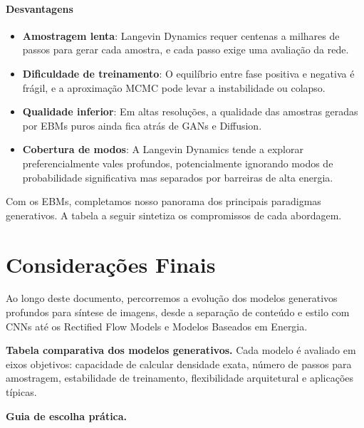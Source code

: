 \documentclass{tufte-handout}
\begin{document}
\paragraph{Desvantagens}
\begin{itemize}
    \item \textbf{Amostragem lenta}: Langevin Dynamics requer centenas a milhares de passos para gerar cada amostra, e cada passo exige uma avaliação da rede.
    \item \textbf{Dificuldade de treinamento}: O equilíbrio entre fase positiva e negativa é frágil, e a aproximação MCMC pode levar a instabilidade ou colapso.
    \item \textbf{Qualidade inferior}: Em altas resoluções, a qualidade das amostras geradas por EBMs puros ainda fica atrás de GANs e Diffusion.
    \item \textbf{Cobertura de modos}: A Langevin Dynamics tende a explorar preferencialmente vales profundos, potencialmente ignorando modos de probabilidade significativa mas separados por barreiras de alta energia.
\end{itemize}

\medskip
\noindent Com os EBMs, completamos nosso panorama dos principais paradigmas generativos. A tabela a seguir sintetiza os compromissos de cada abordagem.

\section{Considerações Finais}

Ao longo deste documento, percorremos a evolução dos modelos generativos profundos para síntese de imagens, desde a separação de conteúdo e estilo com CNNs até os Rectified Flow Models e Modelos Baseados em Energia.

\medskip
\noindent\textbf{Tabela comparativa dos modelos generativos.}
Cada modelo é avaliado em eixos objetivos: capacidade de calcular densidade exata, número de passos para amostragem, estabilidade de treinamento, flexibilidade arquitetural e aplicações típicas.

\medskip
\noindent\textbf{Guia de escolha prática.}
\end{document}
